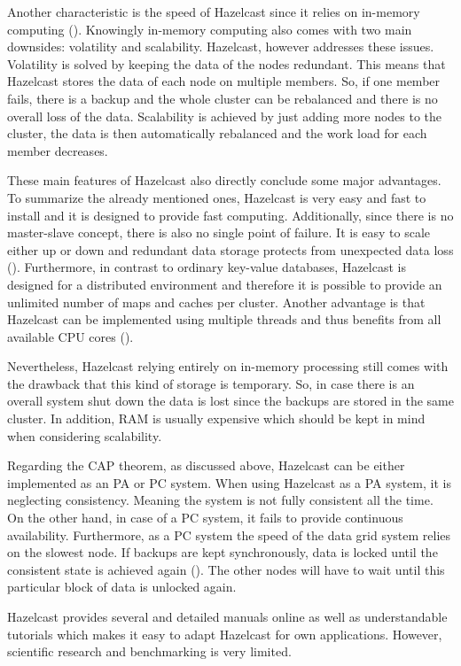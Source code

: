 Another characteristic is the speed of Hazelcast since it relies on in-memory computing (\cite{hazelcastmanual}). Knowingly in-memory computing also comes with two main downsides: volatility and scalability. Hazelcast, however addresses these issues.
Volatility is solved by keeping the data of the nodes redundant. This means that Hazelcast stores the data of each node on multiple members. So, if one member fails, there is a backup and the whole cluster can be rebalanced and there is no overall loss of the data.
Scalability is achieved by just adding more nodes to the cluster, the data is then automatically rebalanced and the work load for each member decreases.

These main features of Hazelcast also directly conclude some major advantages. To summarize the already mentioned ones, Hazelcast is very easy and fast to install and it is designed to provide fast computing. Additionally, since there is no master-slave concept, there is also no single point of failure. It is easy to scale either up or down and redundant data storage protects from unexpected data loss (\cite{hazelcastnosql}).
Furthermore, in contrast to ordinary key-value databases, Hazelcast is designed for a distributed environment and therefore it is possible to provide an unlimited number of maps and caches per cluster. Another advantage is that Hazelcast can be implemented using multiple threads and thus benefits from all available CPU cores (\cite{hazelcastredis}).

Nevertheless, Hazelcast relying entirely on in-memory processing still comes with the drawback that this kind of storage is temporary. So, in case there is an overall system shut down the data is lost since the backups are stored in the same cluster. In addition, RAM is usually expensive which should be kept in mind when considering scalability.

Regarding the CAP theorem, as discussed above, Hazelcast can be either implemented as an PA or PC system. When using Hazelcast as a PA system, it is neglecting consistency. Meaning the system is not fully consistent all the time. On the other hand, in case of a PC system, it fails to provide continuous availability.
Furthermore, as a PC system the speed of the data grid system relies on the slowest node. If backups are kept synchronously, data is locked until the consistent state is achieved again (\cite{johns2015}). The other nodes will have to wait until this particular block of data is unlocked again.


Hazelcast provides several and detailed manuals online as well as understandable tutorials which makes it easy to adapt Hazelcast for own applications. However, scientific research and benchmarking is very limited.